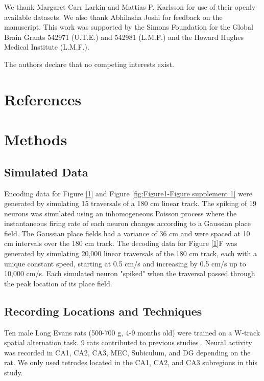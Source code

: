 \documentclass[times, twoside]{zHenriquesLab-StyleBioRxiv}
\begin{document}
\begin{acknowledgements}
We thank Margaret Carr Larkin and Mattias P. Karlsson for use of their openly available datasets. We also thank Abhilasha Joshi for feedback on the manuscript. This work was supported by the Simons Foundation for the Global Brain Grants 542971 (U.T.E.) and 542981 (L.M.F.) and the Howard Hughes Medical Institute (L.M.F.).
\end{acknowledgements}

\begin{interests}
The authors declare that no competing interests exist.
\end{interests}

\begin{contributions}

\end{contributions}

\section*{References}


\onecolumn
\newpage

\section*{Methods}

\subsection*{Simulated Data}
Encoding data for Figure \ref{1} and Figure \ref{fig:Figure1-Figure supplement 1} were generated by simulating 15 traversals of a 180 cm linear track. The spiking of 19 neurons was simulated using an inhomogeneous Poisson process where the instantaneous firing rate of each neuron changes according to a Gaussian place field. The Gaussian place fields had a variance of 36 cm and were spaced at 10 cm intervals over the 180 cm track. The decoding data for Figure \ref{1}F was generated by simulating 20,000 linear traversals of the 180 cm track, each with a unique constant speed, starting at 0.5 cm/s and increasing by 0.5 cm/s up to 10,000 cm/s. Each simulated neuron "spiked" when the traversal passed through the peak location of its place field.

\subsection*{Recording Locations and Techniques}
Ten male Long Evans rats (500-700 g, 4-9 months old) were trained on a W-track spatial alternation task. 9 rats contributed to previous studies \cite{KarlssonAwakereplayremote2009, KayConstantSubsecondCycling2020, Kayhippocampalnetworkspatial2016, CarrTransientSlowGamma2012}. Neural activity was recorded in CA1, CA2, CA3, MEC, Subiculum, and DG depending on the rat. We only used tetrodes located in the CA1, CA2, and CA3 subregions in this study.
\end{document}
